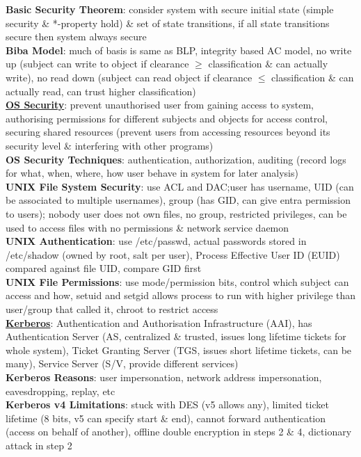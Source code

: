 \documentclass[a4paper]{article}
\begin{document}
\begin{multicols}{2}
        \textbf{Basic Security Theorem}: consider system with secure initial state (simple security \& *-property hold) \& set of state transitions, if all state transitions secure then system always secure\\
        \textbf{Biba Model}: much of basis is same as BLP, integrity based AC model, no write up (subject can write to object if clearance $\geq$ classification \& can actually write), no read down (subject can read object if clearance $\leq$ classification \& can actually read, can trust higher classification)\\
        \underline{\textbf{OS Security}}: prevent unauthorised user from gaining access to system, authorising permissions for different subjects and objects for access control, securing shared resources (prevent users from accessing resources beyond its security level \& interfering with other programs)\\
        \textbf{OS Security Techniques}: authentication, authorization, auditing (record logs for what, when, where, how user behave in system for later analysis)\\
        \textbf{UNIX File System Security}: use ACL and DAC;\@ user has username, UID (can be associated to multiple usernames), group (has GID, can give entra permission to users); nobody user does not own files, no group, restricted privileges, can be used to access files with no permissions \& network service daemon\\
        \textbf{UNIX Authentication}: use /etc/passwd, actual passwords stored in /etc/shadow (owned by root, salt per user), Process Effective User ID (EUID) compared against file UID, compare GID first\\
        \textbf{UNIX File Permissions}: use mode/permission bits, control which subject can access and how, setuid and setgid allows process to run with higher privilege than user/group that called it, chroot to restrict access\\
        \underline{\textbf{Kerberos}}: Authentication and Authorisation Infrastructure (AAI), has Authentication Server (AS, centralized \& trusted, issues long lifetime tickets for whole system), Ticket Granting Server (TGS, issues short lifetime tickets, can be many), Service Server (S/V, provide different services)\\
        \textbf{Kerberos Reasons}: user impersonation, network address impersonation, eavesdropping, replay, etc\\
        \textbf{Kerberos v4 Limitations}: stuck with DES (v5 allows any), limited ticket lifetime (8 bits, v5 can specify start \& end), cannot forward authentication (access on behalf of another), offline double encryption in steps 2 \& 4, dictionary attack in step 2\\

\end{multicols}
\end{document}
